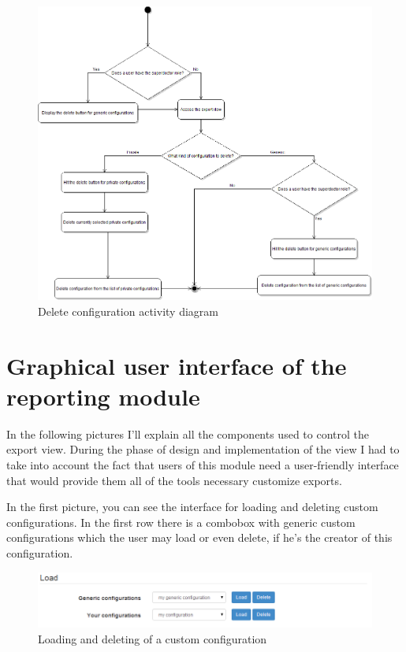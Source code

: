 \documentclass[thesis=B,english]{FITthesis}[2012/10/20]
\begin{document}
\begin{figure}[ht]\centering
\includegraphics[width=0.5\paperwidth]{deleteConfigurationDiagram}
		\caption{Delete configuration activity diagram}
\end{figure}



\section{Graphical user interface of the reporting module}
In the following pictures I'll explain all the components used to control the export view. During the phase of design and implementation of the view I had to take into account the fact that users of this module need a user-friendly interface that would provide them all of the tools necessary customize exports.

In the first picture, you can see the interface for loading and deleting custom configurations. In the first row there is a combobox with generic custom configurations which the user may load or even delete, if he's the creator of this configuration.

\begin{figure}[ht]\centering
\includegraphics[width=0.6\paperwidth]{load}
		\caption{Loading and deleting of a custom configuration}
\end{figure}
\end{document}
